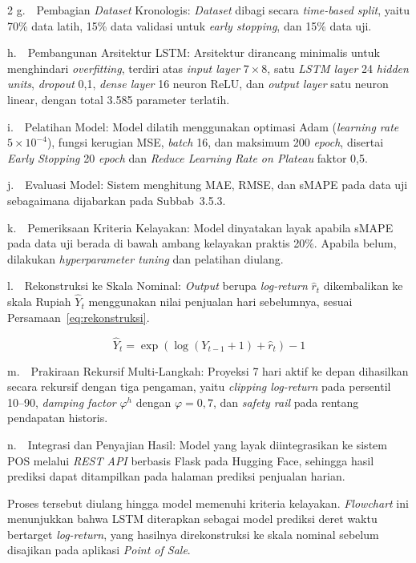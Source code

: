 \documentclass[12pt, a4paper, onecolumn, oneside]{report}
\begin{document}
\begin{spacing}{2}
\noindent g.~~Pembagian \textit{Dataset} Kronologis: \textit{Dataset} dibagi secara \textit{time-based split}, yaitu 70\% data latih, 15\% data validasi untuk \textit{early stopping}, dan 15\% data uji.

\noindent h.~~Pembangunan Arsitektur LSTM: Arsitektur dirancang minimalis untuk menghindari \textit{overfitting}, terdiri atas \textit{input layer} $7 \times 8$, satu \textit{LSTM layer} 24 \textit{hidden units}, \textit{dropout} 0,1, \textit{dense layer} 16 neuron ReLU, dan \textit{output layer} satu neuron linear, dengan total 3.585 parameter terlatih.

\noindent i.~~Pelatihan Model: Model dilatih menggunakan optimasi Adam (\textit{learning rate} $5 \times 10^{-4}$), fungsi kerugian MSE, \textit{batch} 16, dan maksimum 200 \textit{epoch}, disertai \textit{Early Stopping} 20 \textit{epoch} dan \textit{Reduce Learning Rate on Plateau} faktor 0,5.

\noindent j.~~Evaluasi Model: Sistem menghitung MAE, RMSE, dan sMAPE pada data uji sebagaimana dijabarkan pada Subbab~3.5.3.

\noindent k.~~Pemeriksaan Kriteria Kelayakan: Model dinyatakan layak apabila sMAPE pada data uji berada di bawah ambang kelayakan praktis 20\%. Apabila belum, dilakukan \textit{hyperparameter tuning} dan pelatihan diulang.

\noindent l.~~Rekonstruksi ke Skala Nominal: \textit{Output} berupa \textit{log-return} $\hat{r}_t$ dikembalikan ke skala Rupiah $\hat{Y}_t$ menggunakan nilai penjualan hari sebelumnya, sesuai Persamaan~\ref{eq:rekonstruksi}.

\begin{equation}
    \hat{Y}_{t} = \exp\left(\log(Y_{t-1} + 1) + \hat{r}_{t}\right) - 1
    \label{eq:rekonstruksi}
\end{equation}

\noindent m.~~Prakiraan Rekursif Multi-Langkah: Proyeksi 7 hari aktif ke depan dihasilkan secara rekursif dengan tiga pengaman, yaitu \textit{clipping log-return} pada persentil 10--90, \textit{damping factor} $\varphi^h$ dengan $\varphi = 0{,}7$, dan \textit{safety rail} pada rentang pendapatan historis.

\noindent n.~~Integrasi dan Penyajian Hasil: Model yang layak diintegrasikan ke sistem POS melalui \textit{REST API} berbasis Flask pada Hugging Face, sehingga hasil prediksi dapat ditampilkan pada halaman prediksi penjualan harian.

Proses tersebut diulang hingga model memenuhi kriteria kelayakan. \textit{Flowchart} ini menunjukkan bahwa LSTM diterapkan sebagai model prediksi deret waktu bertarget \textit{log-return}, yang hasilnya direkonstruksi ke skala nominal sebelum disajikan pada aplikasi \textit{Point of Sale}.


\end{spacing}
\end{document}
